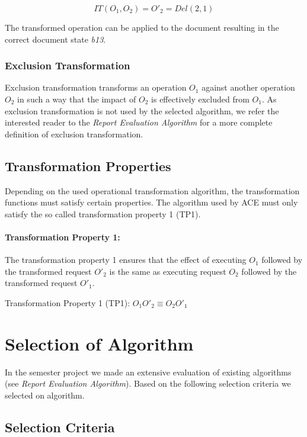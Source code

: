 $$ IT(O_1,O_2) = O'_2 = Del(2,1) $$

The transformed operation can be applied to the document resulting in the
correct document state \emph{b13}.

\subsubsection{Exclusion Transformation}
Exclusion transformation transforms an operation $O_1$ against another operation
$O_2$ in such a way that the impact of $O_2$ is effectively excluded from
$O_1$. As exclusion transformation is not used by the selected algorithm, we
refer the interested reader to the \emph{Report Evaluation Algorithm} for
a more complete definition of exclusion transformation.


\subsection{Transformation Properties}
Depending on the used operational transformation algorithm, the transformation
functions must satisfy certain properties. The algorithm used by ACE must
only satisfy the so called transformation property 1 (TP1). 

\paragraph{Transformation Property 1:}
The transformation property 1 ensures that the effect of executing $O_1$
followed by the transformed request $O'_2$ is the same as executing
request $O_2$ followed by the transformed request $O'_1$.

\begin{defn}
Transformation Property 1 (TP1):
$ O_1 O'_2 \equiv O_2 O'_1 $
\end{defn}



\section{Selection of Algorithm}
In the semester project we made an extensive evaluation of existing algorithms
(see \emph{Report Evaluation Algorithm}). Based on the following selection
criteria we selected on algorithm.


\subsection{Selection Criteria}

